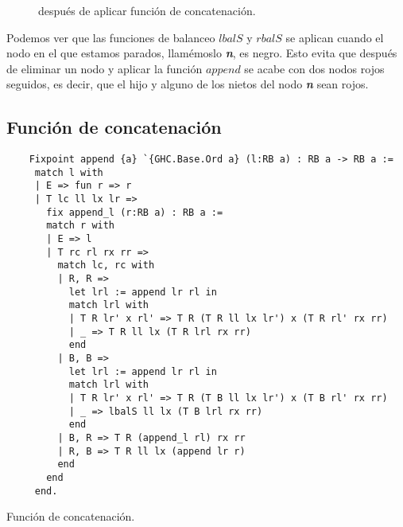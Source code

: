\begin{figure}[!ht]
\centering
\captionsetup{justification=centering}
\caption{{\Arn} después de aplicar función de concatenaci\'on.}
\label{arbolRB_6}
\end{figure}

Podemos ver que las funciones de balanceo \hyperref[lbalS]{$lbalS$} y \hyperref[lbalS]{$rbalS$} se 
aplican cuando el nodo en el que estamos parados, llamémoslo \textbf{\textit{n}}, es negro. Esto 
evita que después de eliminar un nodo y aplicar la funci\'on \hyperref[func_app]{$append$} se acabe 
con dos nodos rojos seguidos, es decir, que el hijo y alguno de los nietos del nodo 
\textbf{\textit{n}} sean rojos.

\subsection{Funci\'on de concatenaci\'on}

\begin{listing}[!ht]
    \centering
    \captionsetup{justification=centering}
    \begin{verbatim}
    Fixpoint append {a} `{GHC.Base.Ord a} (l:RB a) : RB a -> RB a :=
     match l with
     | E => fun r => r
     | T lc ll lx lr =>
       fix append_l (r:RB a) : RB a :=
       match r with
       | E => l
       | T rc rl rx rr =>
         match lc, rc with
         | R, R =>
           let lrl := append lr rl in
           match lrl with
           | T R lr' x rl' => T R (T R ll lx lr') x (T R rl' rx rr)
           | _ => T R ll lx (T R lrl rx rr)
           end
         | B, B =>
           let lrl := append lr rl in
           match lrl with
           | T R lr' x rl' => T R (T B ll lx lr') x (T B rl' rx rr)
           | _ => lbalS ll lx (T B lrl rx rr)
           end
         | B, R => T R (append_l rl) rx rr
         | R, B => T R ll lx (append lr r)
         end
       end
     end.
    \end{verbatim}
    \caption{Funci\'on de concatenaci\'on.}
    \label{func_app}
    \end{listing}

